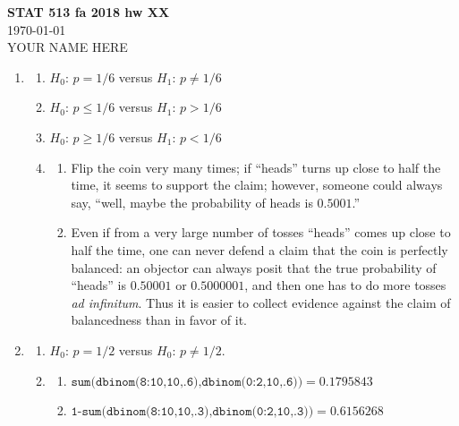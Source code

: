 \documentclass[12pt]{article}
\begin{document}
\begin{centering}
{\bf \large STAT 513 fa 2018 hw XX} \\
\today\\
\vspace{12pt}
YOUR NAME HERE\\
\end{centering}


\begin{enumerate}

\item 
\begin{enumerate}
    \item $H_0$: $p = 1/6$ versus $H_1$: $p\neq 1/6$
    \item $H_0$: $p \leq 1/6$ versus $H_1$: $p >  1/6$
    \item $H_0$: $p \geq 1/6$ versus $H_1$: $p <  1/6$
    \item  
    \begin{enumerate}
        \item Flip the coin very many times; if ``heads'' turns up close to half the time, it seems to support the claim; however, someone could always say, ``well, maybe the probability of heads is $0.5001$.''  
        \item Even if from a very large number of tosses ``heads'' comes up close to half the time, one can never defend a claim that the coin is perfectly balanced: an objector can always posit that the true probability of ``heads'' is $0.50001$ or $0.5000001$, and then one has to do more tosses {\it ad infinitum}.  Thus it is easier to collect evidence against the claim of balancedness than in favor of it.
    \end{enumerate}
\end{enumerate}
    
\item 
\begin{enumerate}
    \item $H_0$: $p=1/2$ versus $H_0$: $p \neq 1/2$.
    
    \item 
    \begin{enumerate}
        \item $\texttt{sum(dbinom(8:10,10,.6),dbinom(0:2,10,.6))}=0.1795843$
        \item $\texttt{1-sum(dbinom(8:10,10,.3),dbinom(0:2,10,.3))}= 0.6156268$
        

\end{enumerate}
\end{enumerate}
\end{enumerate}
\end{document}
